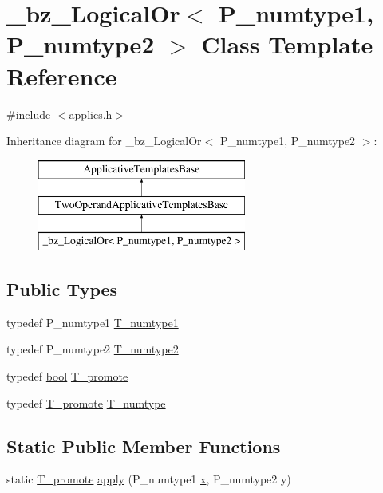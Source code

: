 \hypertarget{class__bz__LogicalOr}{}\section{\+\_\+bz\+\_\+\+Logical\+Or$<$ P\+\_\+numtype1, P\+\_\+numtype2 $>$ Class Template Reference}
\label{class__bz__LogicalOr}


{\ttfamily \#include $<$applics.\+h$>$}

Inheritance diagram for \+\_\+bz\+\_\+\+Logical\+Or$<$ P\+\_\+numtype1, P\+\_\+numtype2 $>$\+:\begin{figure}[H]
\begin{center}
\leavevmode
\includegraphics[height=3.000000cm]{class__bz__LogicalOr}
\end{center}
\end{figure}
\subsection*{Public Types}
\begin{DoxyCompactItemize}
\item 
typedef P\+\_\+numtype1 \hyperlink{class__bz__LogicalOr_a1e18554e45fdc303f5848c36ba23fc3a}{T\+\_\+numtype1}
\item 
typedef P\+\_\+numtype2 \hyperlink{class__bz__LogicalOr_a2bb4cea0a17a474125daeaa515a2777f}{T\+\_\+numtype2}
\item 
typedef \hyperlink{compiler_8h_abb452686968e48b67397da5f97445f5b}{bool} \hyperlink{class__bz__LogicalOr_a00ba6e696cf25190221df937a18b6bfd}{T\+\_\+promote}
\item 
typedef \hyperlink{class__bz__LogicalOr_a00ba6e696cf25190221df937a18b6bfd}{T\+\_\+promote} \hyperlink{class__bz__LogicalOr_a4cbb68f8e6d036bc980ef51ae4b6ea29}{T\+\_\+numtype}
\end{DoxyCompactItemize}
\subsection*{Static Public Member Functions}
\begin{DoxyCompactItemize}
\item 
static \hyperlink{class__bz__LogicalOr_a00ba6e696cf25190221df937a18b6bfd}{T\+\_\+promote} \hyperlink{class__bz__LogicalOr_aecd9d395aa78955dfb34cde7f4b647a9}{apply} (P\+\_\+numtype1 \hyperlink{vecnorm1_8cc_ac73eed9e41ec09d58f112f06c2d6cb63}{x}, P\+\_\+numtype2 y)
\end{DoxyCompactItemize}



